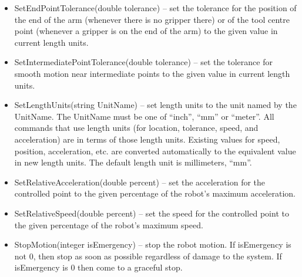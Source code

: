 \begin{itemize}
\item \sf SetEndPointTolerance(double tolerance) \rm -- set the tolerance
  for the position of the end of the arm (whenever there is no gripper
  there) or of the tool centre point (whenever a gripper is on the end of
  the arm) to the given value in current length units.\\

\item \sf SetIntermediatePointTolerance(double tolerance) \rm -- set the
  tolerance for smooth motion near intermediate points to the given value
  in current length units.\\

\item \sf SetLengthUnits(string UnitName) \rm -- set length units to the
  unit named by the \sf UnitName\rm.  The \sf UnitName \rm must be one of
  ``inch'', ``mm'' or ``meter''. All commands that use length units (for
  location, tolerance, speed, and acceleration) are in terms of those
  length units. Existing values for speed, position, acceleration, etc. are
  converted automatically to the equivalent value in new length units. The
  default length unit is millimeters, ``mm''.\\

\item \sf SetRelativeAcceleration(double percent) \rm -- set the
  acceleration for the controlled point to the given percentage of the
  robot's maximum acceleration.\\

\item \sf SetRelativeSpeed(double percent) \rm -- set the speed for the
  controlled point to the given percentage of the robot's maximum speed.\\

%

\item \sf StopMotion(integer isEmergency) \rm -- stop the robot motion. If
  \sf isEmergency \rm is not 0, then stop as soon as possible regardless of
  damage to the system. If \sf isEmergency \rm is 0 then come to a graceful
  stop.\\

\end{itemize}

